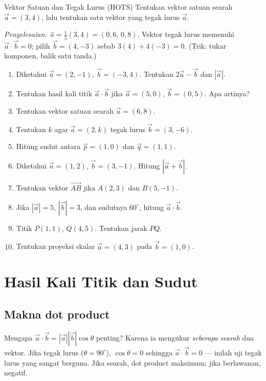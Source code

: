 \documentclass[11pt,a4paper]{report}
\theoremstyle{gaya}
\newcommand{\jawab}{\par\smallskip\noindent\textit{\textcolor{oranye}{Penyelesaian:}}\ }
\begin{document}
\begin{contoh}{Vektor Satuan dan Tegak Lurus (HOTS)}
Tentukan vektor satuan searah $\vec a=(3,4)$, lalu tentukan satu vektor yang tegak lurus $\vec a$.

\jawab $\hat a=\tfrac15(3,4)=(0{,}6,\,0{,}8)$. Vektor tegak lurus memenuhi $\vec a\cdot\vec b=0$; pilih $\vec b=(4,-3)$ sebab $3(4)+4(-3)=0$. (Trik: tukar komponen, balik satu tanda.)
\end{contoh}

\begin{latihan}
\begin{enumerate}[leftmargin=*]
  \item Diketahui $\vec a=(2,-1)$, $\vec b=(-3,4)$. Tentukan $2\vec a - \vec b$ dan $|\vec a|$.
  \item Tentukan hasil kali titik $\vec a \cdot \vec b$ jika $\vec a=(5,0)$, $\vec b=(0,5)$. Apa artinya?
  \item Tentukan vektor satuan searah $\vec u=(6,8)$.
  \item Tentukan $k$ agar $\vec a=(2,k)$ tegak lurus $\vec b=(3,-6)$.
  \item Hitung sudut antara $\vec p=(1,0)$ dan $\vec q=(1,1)$.
  \item Diketahui $\vec a=(1,2)$, $\vec b=(3,-1)$. Hitung $|\vec a+\vec b|$.
  \item Tentukan vektor $\vec{AB}$ jika $A(2,3)$ dan $B(5,-1)$.
  \item Jika $|\vec a|=5$, $|\vec b|=3$, dan sudutnya $60^\circ$, hitung $\vec a\cdot\vec b$.
  \item Titik $P(1,1)$, $Q(4,5)$. Tentukan jarak $PQ$.
  \item Tentukan proyeksi skalar $\vec a=(4,3)$ pada $\vec b=(1,0)$.
\end{enumerate}
\end{latihan}

\section{Hasil Kali Titik dan Sudut}

\subsection*{Makna dot product}
Mengapa $\vec a\cdot\vec b=|\vec a||\vec b|\cos\theta$ penting? Karena ia mengukur \emph{seberapa searah} dua vektor. Jika tegak lurus ($\theta=90^\circ$), $\cos\theta=0$ sehingga $\vec a\cdot\vec b=0$ --- inilah uji tegak lurus yang sangat berguna. Jika searah, dot product maksimum; jika berlawanan, negatif.
\end{document}
